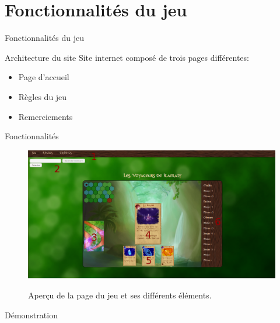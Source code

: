 \documentclass{bredelebeamer}
\begin{document}
\section{Fonctionnalités du jeu}

\begin{frame}{Fonctionnalités du jeu}
 \begin{block}{Architecture du site}
  Site internet composé de trois pages différentes:
   \begin{itemize}
     \item Page d'accueil
     \item Règles du jeu
     \item Remerciements
   \end{itemize}
 \end{block}
\end{frame}

\begin{frame}{Fonctionnalités}
\begin{figure}[h!]
			\centering
			\includegraphics[scale=0.25]{manual.png}
			\label{fig:manual}
			\caption{Aperçu de la page du jeu et ses différents éléments.}
		\end{figure}
  \end{frame}
   \begin{frame}{Démonstration}
  \end{frame}
%
%
%
%
%
%
%
%
\end{document}
